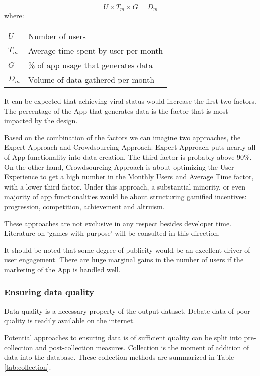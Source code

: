 \documentclass{article}
\makeatletter
\newenvironment{conditions}
  {\par\vspace{\abovedisplayskip}\noindent\begin{tabular}{>{$}l<{$} @{${}={}$} l}}
  {\end{tabular}\par\vspace{\belowdisplayskip}}
\makeatother
\begin{document}

\begin{equation}
U \times T_{m}  \times G = D_{m}
\end{equation}
where:
\begin{conditions}
 U     &  Number of users \\
 T_{m}     &  Average time spent by user per month \\   
 G &  \% of app usage that generates data \\
 D_{m} & Volume of data gathered per month
\end{conditions}

It can be expected that achieving viral status would increase the first two factors. The percentage of the App that generates data is the factor that is most impacted by the design.

Based on the combination of the factors we can imagine two approaches, the Expert Approach and Crowdsourcing Approach. 
Expert Approach puts nearly all of App functionality into data-creation. The third factor is probably above {90\%}.
On the other hand, Crowdsourcing Approach is about optimizing the User Experience to get a high number in the Monthly Users and Average Time factor, with a lower third factor.
Under this approach, a substantial minority, or even majority of app functionalities would be about structuring gamified incentives: progression, competition, achievement and altruism.

These approaches are not exclusive in any respect besides developer time.
Literature on `games with purpose' will be consulted in this direction.

It should be noted that some degree of publicity would be an excellent driver of user engagement. There are huge marginal gains in the number of users if the marketing of the App is handled well.

\subsubsection{Ensuring data quality}
Data quality is a necessary property of the output dataset. Debate data of poor quality is readily available on the internet.

Potential approaches to ensuring data is of sufficient quality can be split into pre-collection and post-collection measures. Collection is the moment of addition of data into the database. These collection methods are summarized in Table \ref{tab:collection}.
\end{document}
